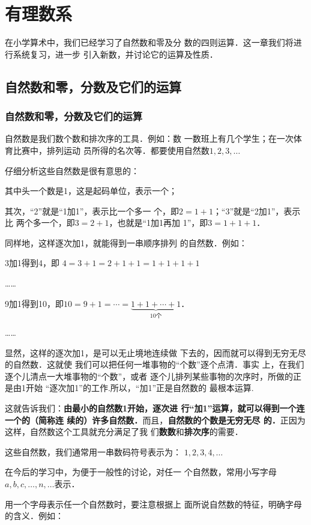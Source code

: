 \chapter{有理数系}

在小学算术中，我们已经学习了自然数和零及分
数的四则运算．这一章我们将进行系统复习，进一步
引入新数，并讨论它的运算及性质．

\section{自然数和零，分数及它们的运算}

\subsection{自然数和零，分数及它们的运算}

自然数是我们数个数和排次序的工具．例如：数
一数班上有几个学生；在一次体育比赛中，排列运动
员所得的名次等．都要使用自然数$1,  2,  3,\ldots$

仔细分析这些自然数是很有意思的：

其中头一个数是1，这是起码单位，表示一个；

其次，“2”就是“1加1”，表示比一个多一
个，即$2=1+1$；“3”就是“2加1”，表示比
两个多一个，即$3=2+1$，也就是“1加1再加
1”，即$3=1+1+1$．

同样地，这样逐次加1，就能得到一串顺序排列
的自然数．例如：  

3加1得到4，即
$4=3+1=2+1+1=1+1+1+1$

……

9加1得到10，即$10= 9+1=\cdots=\underbrace{1+1+\cdots+1}_{10\text{个}}$．

……

显然，这样的逐次加1，是可以无止境地连续做
下去的，因而就可以得到无穷无尽的自然数．这就使
我们可以把任何一堆事物的“个数”逐个点清．事实
上，在我们逐个儿清点一大堆事物的“个数”，或者
逐个儿排列某些事物的次序时，所做的正是由1开始
“逐次加1”的工作.所以，“加1”正是自然数的
最根本运算.

这就告诉我们：\textbf{由最小的自然数1开始，逐次进
	行“加1”运算，就可以得到一个连一个的（简称连
	续的）许多自然数．}而且，\textbf{自然数的个数是无穷无尽
	的．}正因为这样，自然数这个工具就充分满足了我
们\textbf{数数}和\textbf{排次序}的需要．

这些自然数，我们通常用一串数码符号表示为：
$1,2,3,4,\ldots$

在今后的学习中，为便于一般性的讨论，对任一
个自然数，常用小写字母$a,b,c,\ldots,n,\ldots$表示．

用一个字母表示任一个自然数时，要注意根据上
面所说自然数的特征，明确字母的含义．例如：

